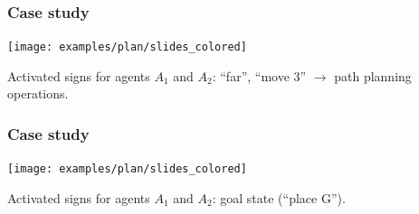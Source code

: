 \documentclass[default]{beamer}
\begin{document}
	\begin{frame}
		\frametitle{Case study}
		
		\begin{center}
			\texttt{[image: examples/plan/slides\_colored]}
		\end{center}
		\par\bigskip
		Activated signs for agents $A_1$ and $A_2$: ``far'', ``move 3'' $\rightarrow$ \color{red} path planning operations.
	\end{frame}
	
	\begin{frame}
		\frametitle{Case study}
		
		\begin{center}
			\texttt{[image: examples/plan/slides\_colored]}
		\end{center}
		\par\bigskip
		Activated signs for agents $A_1$ and $A_2$: goal state (``place G'').
	\end{frame}
														
%		
%				
	
\end{document}
